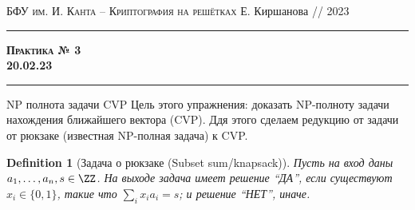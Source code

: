 \documentclass[11pt]{exam}
\newtheorem{definition}[theorem]{Definition}
\theoremstyle{definition}
\newcommand*\abs[1]{\left\lvert#1\right\rvert}
\begin{document}
	{\noindent
		\textsc{БФУ им. И. Канта -- Криптография на решётках}
		\hfill {Е. Киршанова // 2023\\}
	\hrule
	\begin{center}
		{\Large\textbf{
				\textsc{Практика № 3} \\[5pt] {20.02.23}
		} }
	\end{center}
	\hrule \vspace{5mm}
	
	\thispagestyle{empty}
	
	\vspace{0.2cm}
\begin{section}{NP полнота задачи CVP}
	Цель этого упражнения: доказать NP-полноту задачи нахождения ближайшего вектора (CVP). Ддя этого сделаем редукцию от задачи от рюкзаке (известная NP-полная задача) к CVP.
	
	\begin{definition}[Задача о рюкзаке (Subset sum/knapsack)] Пусть на вход даны $a_1, \ldots, a_n, s \in \ZZ$. На выходе задача имеет решение ``ДА'', если существуют $x_i \in \{0,1\}$, такие что $\sum_i x_i a_i = s$;  и решение ``НЕТ'', иначе.
	\end{definition}


\end{section}}
\end{document}
